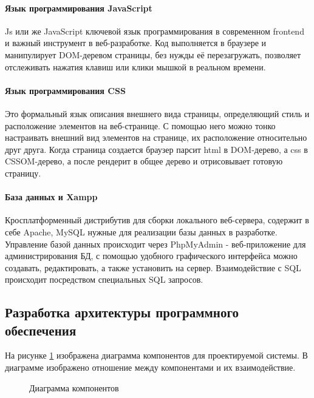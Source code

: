 \paragraph{Язык программирования JavaScript}

Js или же JavaScript ключевой язык программирования в современном frontend и важный инструмент в веб-разработке. Код выполняется в браузере и манипулирует DOM-деревом страницы, без нужды её перезагружать, позволяет отслеживать нажатия клавиш или клики мышкой в реальном времени.

\paragraph{Язык программирования CSS}

Это формальный язык описания внешнего вида страницы, определяющий стиль и расположение элементов на веб-странице. С помощью него можно тонко настраивать внешний вид элементов на странице, их расположение относительно друг друга. Когда страница создается браузер парсит html в DOM-дерево, а css в CSSOM-дерево, а после рендерит в общее дерево и отрисовывает готовую страницу.

\paragraph{База данных и Xampp}

Кросплатформенный  дистрибутив для сборки локального веб-сервера, содержит в себе Apache, MySQL нужные для реализации базы данных в разработке. Управление базой данных происходит через PhpMyAdmin - веб-приложение для администрирования БД, с помощью удобного графического интерфейса можно создавать, редактировать, а также установить на сервер. Взаимодействие с SQL происходит посредством специальных SQL запросов.

\subsection{Разработка архитектуры программного обеспечения}

На рисунке \ref{thatsmedio1:image} изображена диаграмма компонентов для проектируемой системы. В диаграмме изображено отношение между компонентами и их взаимодействие.

\begin{figure}[ht]
\caption{Диаграмма компонентов}
\label{thatsmedio1:image}
\end{figure}


